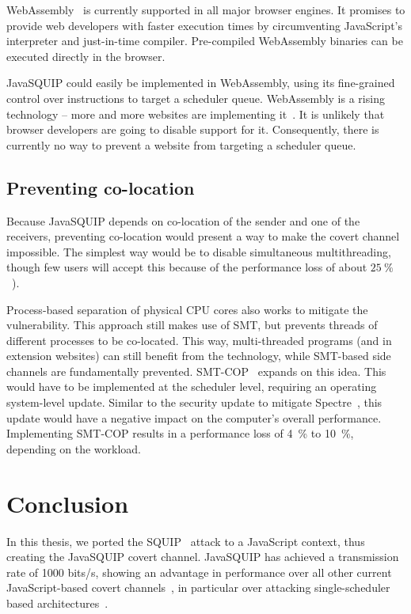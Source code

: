 \documentclass[11pt,
  titlepage=false,
  parskip=half,      %
]{scrreprt}
\begin{document}
WebAssembly~\cite{webassembly} is currently supported in all major browser engines.
It promises to provide web developers with faster execution times by circumventing JavaScript's interpreter and just-in-time compiler.
Pre-compiled WebAssembly binaries can be executed directly in the browser.

JavaSQUIP could easily be implemented in WebAssembly, using its fine-grained control over instructions to
target a scheduler queue.
WebAssembly is a rising technology -- more and more websites are implementing it~\cite{musch2019new}.
It is unlikely that browser developers are going to disable support for it.
Consequently, there is currently no way to prevent a website from targeting a scheduler queue.

\section{Preventing co-location}
Because JavaSQUIP depends on co-location of the sender and one of the receivers,
preventing co-location would present a way to make the covert channel impossible.
The simplest way would be to disable simultaneous multithreading,
though few users will accept this because of the performance loss of about $25~\%$~\cite{Phoronix2018HT, Cutress2020SMT}).

Process-based separation of physical CPU cores also works to mitigate the vulnerability.
This approach still makes use of SMT, but prevents threads of different processes to be co-located.
This way, multi-threaded programs (and in extension websites) can still benefit from the technology,
while SMT-based side channels are fundamentally prevented.
SMT-COP~\cite{townley2019smt} expands on this idea.
This would have to be implemented at the scheduler level, requiring an operating system-level update.
Similar to the security update to mitigate Spectre~\cite{spKocherHFGGHHLM019},
this update would have a negative impact on the computer's overall performance.
Implementing SMT-COP results in a performance loss of 4~\% to 10~\%, depending on the workload.

\chapter{Conclusion}
\label{ch:conclusion}
In this thesis, we ported the SQUIP~\cite{squip} attack to a JavaScript context, thus creating the JavaSQUIP covert channel.
JavaSQUIP has achieved a transmission rate of 1000 bits/s, showing an advantage in performance over
all other current JavaScript-based covert channels~\cite{vila2017loophole, lipp2017practical},
in particular over attacking single-scheduler based architectures~\cite{Rokicki2022webport}.
\end{document}
